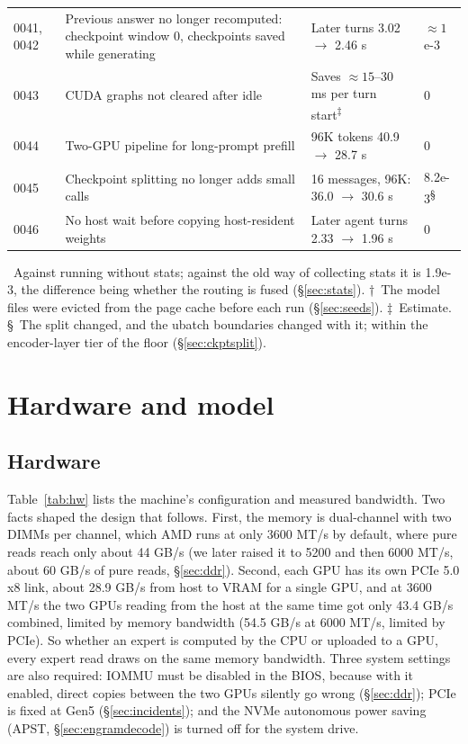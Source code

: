 \documentclass[11pt,a4paper]{article}
\begin{document}
\begin{table}[!tp]
\begin{tabularx}{\textwidth}{@{}l X l l@{}}
    0041, 0042 & Previous answer no longer recomputed: checkpoint window 0, checkpoints saved while generating & Later turns 3.02 $\to$ 2.46 s & $\approx 1$e-3 \\
    0043 & CUDA graphs not cleared after idle & Saves $\approx 15$--30 ms per turn start\textsuperscript{‡} & 0 \\
    0044 & Two-GPU pipeline for long-prompt prefill & 96K tokens 40.9 $\to$ 28.7 s & 0 \\
    0045 & Checkpoint splitting no longer adds small calls & 16 messages, 96K: 36.0 $\to$ 30.6 s & 8.2e-3\textsuperscript{§} \\
    0046 & No host wait before copying host-resident weights & Later agent turns 2.33 $\to$ 1.96 s & 0 \\
    \bottomrule
  \end{tabularx}
  \par\smallskip\raggedright\footnotesize *\ Against running without stats; against the old way of collecting stats it is 1.9e-3, the difference being whether the routing is fused (\S\ref{sec:stats}). †\ The model files were evicted from the page cache before each run (\S\ref{sec:seeds}). ‡\ Estimate. §\ The split changed, and the ubatch boundaries changed with it; within the encoder-layer tier of the floor (\S\ref{sec:ckptsplit}).
\end{table}

\section{Hardware and model}

\subsection{Hardware}

Table~\ref{tab:hw} lists the machine's configuration and measured bandwidth. Two facts shaped the design that follows. First, the memory is dual-channel with two DIMMs per channel, which AMD runs at only 3600 MT/s by default, where pure reads reach only about 44 GB/s (we later raised it to 5200 and then 6000 MT/s, about 60 GB/s of pure reads, \S\ref{sec:ddr}). Second, each GPU has its own PCIe 5.0 x8 link, about 28.9 GB/s from host to VRAM for a single GPU, and at 3600 MT/s the two GPUs reading from the host at the same time got only 43.4 GB/s combined, limited by memory bandwidth (54.5 GB/s at 6000 MT/s, limited by PCIe). So whether an expert is computed by the CPU or uploaded to a GPU, every expert read draws on the same memory bandwidth. Three system settings are also required: IOMMU must be disabled in the BIOS, because with it enabled, direct copies between the two GPUs silently go wrong (\S\ref{sec:ddr}); PCIe is fixed at Gen5 (\S\ref{sec:incidents}); and the NVMe autonomous power saving (APST, \S\ref{sec:engramdecode}) is turned off for the system drive.
\end{document}
